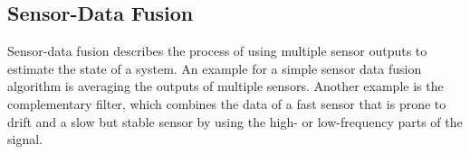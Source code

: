 \documentclass[engproc,conferenceproceedings,submit,pdftex,moreauthors]{Definitions/mdpi}
\begin{document}
 
% 

 
\subsection{Sensor-Data Fusion}
Sensor-data fusion describes the process of using multiple sensor outputs to estimate the state of a system. An example for a simple sensor data fusion algorithm is averaging the
outputs of multiple sensors. Another example is the complementary filter, which combines the data of a fast sensor that is prone to drift and a slow but stable sensor by using the high- or low-frequency parts of the signal.\\
\end{document}
